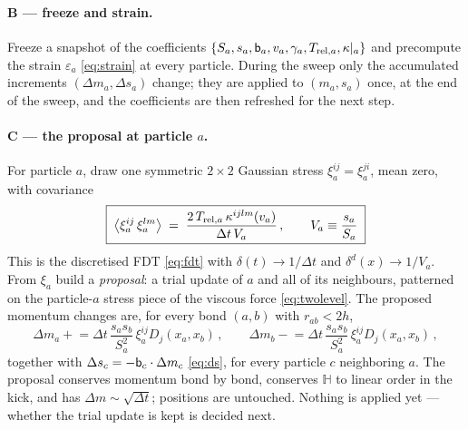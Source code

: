 \documentclass[12pt,aps,preprint,nofootinbib,noshowkeys,noshowpacs,longbibliography,superscriptaddress,tightenlines]{revtex4-2}
\def\bbeta{{\sf b}}
\def\llangle{\left\langle}
\def\rrangle{\right\rangle}
\def\st{\begin{equation}}
\def\stp{\end{equation}}
\begin{document}
\paragraph{B --- freeze and strain.}
Freeze a snapshot of the coefficients
$\{S_a, s_a, \bbeta_a, v_a, \gamma_a, T_{{\rm rel},a}, \kappa|_a\}$ and
precompute the strain $\varepsilon_a$ \eqref{eq:strain} at every particle.
During the sweep only the accumulated increments $(\Delta m_a,\Delta s_a)$
change; they are applied to $(m_a,s_a)$ once, at the end of the sweep, and the
coefficients are then refreshed for the next step.

\paragraph{C --- the proposal at particle $a$.}
For particle $a$, draw one symmetric $2\times2$ Gaussian stress
$\xi_a^{ij}=\xi_a^{ji}$, mean zero, with covariance
\st
\label{eq:persite_cov}
\boxed{\;
\llangle \xi_a^{ij}\,\xi_a^{lm}\rrangle
   \;=\; \frac{2\,T_{{\rm rel},a}\,\kappa^{ijlm}(v_a)}{\Delta t\,V_a}\,,
\qquad V_a \equiv \frac{s_a}{S_a}\;}
\stp
This is the discretised FDT \eqref{eq:fdt} with $\delta(t)\to1/\Delta t$ and
$\delta^d(x)\to1/V_a$.  From $\xi_a$ build a \emph{proposal}: a trial update
of $a$ and all of its neighbours, patterned on the particle-$a$ stress piece of
the viscous force \eqref{eq:twolevel}.  The proposed momentum changes are,
for every bond $(a,b)$ with $r_{ab}<2h$,
\st
\label{eq:kicks}
\boxed{\;
\Delta m_a \mathrel{+}= \Delta t\,\frac{s_a s_b}{S_a^{2}}\,\xi_a^{ij}D_j(x_a,x_b)\,,
\qquad
\Delta m_b \mathrel{-}= \Delta t\,\frac{s_a s_b}{S_a^{2}}\,\xi_a^{ij}D_j(x_a,x_b)\,,\;}
\stp
together with $\Delta s_c=-\bbeta_c\cdot\Delta m_c$ \eqref{eq:ds}, for every
particle $c$ neighboring $a$.  The proposal conserves
momentum bond by bond, conserves $\mathbb H$ to linear order in the kick, and
has $\Delta m\sim\sqrt{\Delta t}$; positions are untouched.  Nothing is
applied yet --- whether the trial update is kept is decided next.
\end{document}
